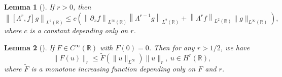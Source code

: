 \documentclass[preprint,12pt]{elsarticle}
\numberwithin{equation}{section}
\newtheorem{lemma}{Lemma}[section]
\begin{document}
\begin{lemma}[\cite{Kato1988}]
\label{lem203}
If $r>0$, then
$$\left\|\left[\Lambda^{r}, f\right] g\right\|_{L^{2}(\mathbb{R})} \leq c\left(\left\|\partial_{x} f\right\|_{L^{\infty}(\mathbb{R})}\left\|\Lambda^{r-1} g\right\|_{L^{2}(\mathbb{R})}+\left\|\Lambda^{r} f\right\|_{L^{2}(\mathbb{R})}\|g\|_{L^{\infty}(\mathbb{R})}\right),$$
where $c$ is a constant depending only on $r$.
\end{lemma}

\begin{lemma}[\cite{Constantin2002}]
\label{lem204}
If $F\in C^{\infty}(\mathbb{R})$ with $F(0)=0$. Then for any $r>1/2$, we have
$$\|F(u)\|_{r}\leq \widetilde{F}(\|u\|_{L^{\infty}})\|u\|_{r},\ u\in H^{r}(\mathbb{R}),$$
where $\widetilde{F}$ is a monotone increasing function depending only on $F$ and $r$.
\end{lemma}
\end{document}
